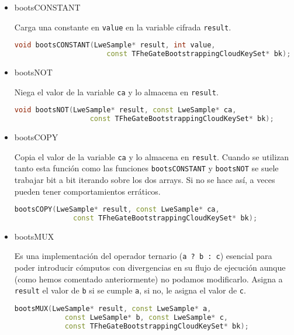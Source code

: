 \begin{itemize}

  \item bootsCONSTANT

  Carga una constante en \verb|value| en la variable cifrada \verb|result|.

  \begin{lstlisting}[language=c++]
    void bootsCONSTANT(LweSample* result, int value,
                      const TFheGateBootstrappingCloudKeySet* bk);
  \end{lstlisting}

  \item bootsNOT

  Niega el valor de la variable \verb|ca| y lo almacena en \verb|result|.

  \begin{lstlisting}[language=c++]
    void bootsNOT(LweSample* result, const LweSample* ca,
                  const TFheGateBootstrappingCloudKeySet* bk);
  \end{lstlisting}

  \item bootsCOPY

  Copia el valor de la variable \verb|ca| y lo almacena en \verb|result|. Cuando se utilizan tanto esta función como las funciones \verb|bootsCONSTANT|  y \verb|bootsNOT| se suele trabajar bit a bit iterando sobre los dos arrays. Si no se hace así, a veces pueden tener comportamientos erráticos.

  \begin{lstlisting}[language=c++]
    bootsCOPY(LweSample* result, const LweSample* ca,
              const TFheGateBootstrappingCloudKeySet* bk);
  \end{lstlisting}

  \item bootsMUX

  Es una implementación del operador ternario (\verb|a ? b : c|) esencial para poder introducir cómputos con divergencias en su flujo de ejecución aunque (como hemos comentado anteriormente) no podamos modificarlo. Asigna a \verb|result| el valor de \verb|b| si se cumple \verb|a|, si no, le asigna el valor de \verb|c|.

  \begin{lstlisting}[language=c++]
    bootsMUX(LweSample* result, const LweSample* a,
            const LweSample* b, const LweSample* c,
            const TFheGateBootstrappingCloudKeySet* bk);
  \end{lstlisting}


\end{itemize}
